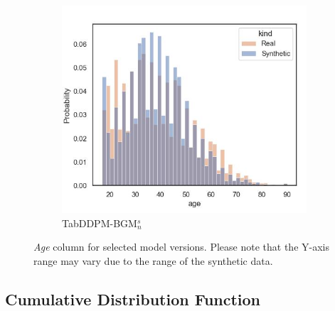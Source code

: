 \begin{figure}[H]
	\begin{subfigure}{0.3\textwidth}
		\centering
		\includegraphics[width=\textwidth]{images/dist_age/tab-ddpm-bgm-simTune-none.jpg}
		\caption{TabDDPM-BGM$^{s}_n$}
	\end{subfigure}
	\caption[Distribution Plots Continuous]{\textit{Age} column for selected \gls{model} versions. Please note that the Y-axis range may vary due to the range of the synthetic data.}
	\label{fig:age}
\end{figure}
\newpage


\subsection{Cumulative Distribution Function}

